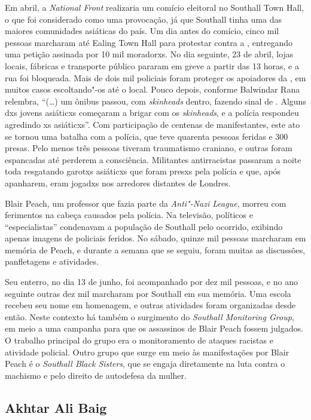 Em abril, a \emph{National Front} realizaria um comício eleitoral no Southall Town Hall, o que foi considerado como uma provocação, já que Southall tinha uma das maiores comunidades asiáticas do país. Um dia antes do comício, cinco mil pessoas marcharam até Ealing Town Hall para protestar contra a , entregando uma petição assinada por 10 mil moradorxs. No dia seguinte, 23 de abril, lojas locais, fábricas e transporte público pararam em greve a partir das 13 horas, e a rua foi bloqueada. Mais de dois mil policiais foram proteger os apoiadores da , em muitos casos escoltando"-os até o local. Pouco depois, conforme Balwindar Rana relembra, ``(\ldots{}) um ônibus passou, com \emph{skinheads} dentro, fazendo sinal de . Alguns dxs jovens asiáticxs começaram a brigar com os \emph{skinheads}, e a polícia respondeu agredindo xs asiáticxs''. Com participação de centenas de manifestantes, este ato se tornou uma batalha com a polícia, que teve quarenta pessoas feridas e 300 presas. Pelo menos três pessoas tiveram traumatismo craniano, e outras foram espancadas até perderem a consciência. Militantes antirracistas passaram a noite toda resgatando garotxs asiáticxs que foram presxs pela polícia e que, após apanharem, eram jogadxs nos arredores distantes de Londres. 




Blair Peach, um professor que fazia parte da \emph{Anti"-Nazi League}, morreu com ferimentos na cabeça causados pela polícia. Na televisão, políticos e ``especialistas'' condenavam a população de Southall pelo ocorrido, exibindo apenas imagens de policiais feridos. No sábado, quinze mil pessoas marcharam em memória de Peach, e durante a semana que se seguiu, foram muitas as discussões, panfletagens e atividades.

Seu enterro, no dia 13 de junho, foi acompanhado por dez mil pessoas, e no ano seguinte outras dez mil marcharam por Southall em sua memória. Uma escola recebeu seu nome em homenagem, e outras atividades foram organizadas desde então. Neste contexto há também o surgimento do \emph{Southall Monitoring Group}, em meio a uma campanha para que os assassinos de Blair Peach fossem julgados. O trabalho principal do grupo era o monitoramento de ataques racistas e atividade policial. Outro grupo que surge em meio às manifestações por Blair Peach é o \emph{Southall Black Sisters}, que se engaja diretamente na luta contra o machismo e pelo direito de autodefesa da mulher.


\subsection{Akhtar Ali Baig}

